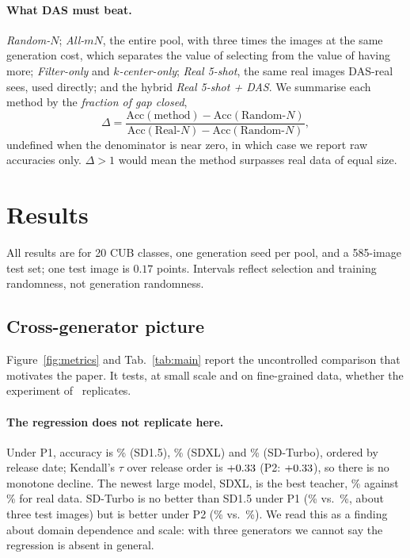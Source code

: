 \documentclass[10pt,twocolumn,letterpaper]{article}
\begin{document}
\paragraph{What DAS must beat.} \emph{Random-$N$}; \emph{All-$mN$}, the entire pool, with three times the images at the same generation cost, which separates the value of selecting from the value of having more; \emph{Filter-only} and \emph{$k$-center-only}; \emph{Real 5-shot}, the same real images DAS-real sees, used directly; and the hybrid \emph{Real 5-shot + DAS}. We summarise each method by the \emph{fraction of gap closed},
\begin{equation}\label{eq:delta}
\Delta=\frac{\text{Acc}(\text{method})-\text{Acc}(\text{Random-}N)}{\text{Acc}(\text{Real-}N)-\text{Acc}(\text{Random-}N)},
\end{equation}
undefined when the denominator is near zero, in which case we report raw accuracies only. $\Delta{>}1$ would mean the method surpasses real data of equal size.

\section{Results}
All results are for 20 CUB classes, one generation seed per pool, and a 585-image test set; one test image is $0.17$ points. Intervals reflect selection and training randomness, not generation randomness.

\subsection{Cross-generator picture}\label{sec:cross}
Figure~\ref{fig:metrics} and Tab.~\ref{tab:main} report the uncontrolled comparison that motivates the paper. It tests, at small scale and on fine-grained data, whether the experiment of~\cite{adamkiewicz2026pretty} replicates.

\paragraph{The regression does not replicate here.} Under P1, accuracy is \accAa\% (SD1.5), \accCa\% (SDXL) and \accBa\% (SD-Turbo), ordered by release date; Kendall's $\tau$ over release order is $+0.33$ (P2: $+0.33$), so there is no monotone decline. The newest large model, SDXL, is the best teacher, \accCa\% against \RealN\% for real data. SD-Turbo is no better than SD1.5 under P1 (\accBa\% vs.\ \accAa\%, about three test images) but is better under P2 (\accBb\% vs.\ \accAb\%). We read this as a finding about domain dependence and scale: with three generators we cannot say the regression is absent in general.
\end{document}
